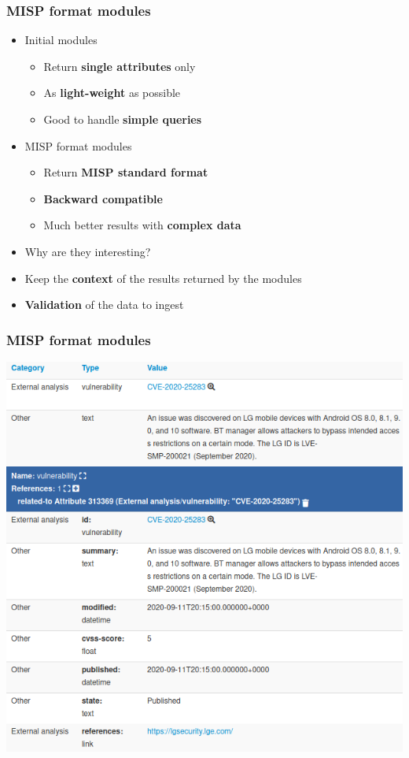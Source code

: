 \begin{frame}
\frametitle{MISP format modules}
\begin{itemize}
    \item Initial modules
    \begin{itemize}
        \item Return {\bf single attributes} only
        \item As {\bf light-weight} as possible
        \item Good to handle {\bf simple queries}
    \end{itemize}
    \item MISP format modules
    \begin{itemize}
        \item Return {\bf MISP standard format}
        \item {\bf Backward compatible}
        \item Much better results with {\bf complex data}
    \end{itemize}
\end{itemize}
\pause
\begin{itemize}
    \item Why are they interesting?
    \pause
    \item Keep the {\bf context} of the results returned by the modules
    \item {\bf Validation} of the data to ingest
\end{itemize}
\end{frame}

\begin{frame}
\frametitle{MISP format modules}
\begin{center}
    \includegraphics[width=0.7\linewidth]{cve_module.png}
\end{center}
\end{frame}

